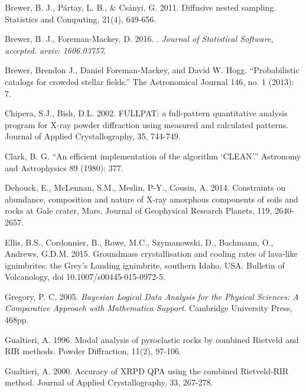 \documentclass[review]{elsarticle}
\newcommand{\changed}{\color{blue}}
\begin{document}
\begin{thebibliography}{99}
Brewer, B. J., Pártay, L. B., \& Csányi, G. 2011. Diffusive nested sampling. Statistics and Computing, 21(4), 649-656.

Brewer, B. J., Foreman-Mackey, D. 2016.
.
\newblock \emph{Journal of Statistical Software, accepted. arxiv: 1606.03757}.

{\changed 
{}
Brewer, Brendon J., Daniel Foreman-Mackey, and David W. Hogg. ``Probabilistic catalogs for crowded stellar fields.'' The Astronomical Journal 146, no. 1 (2013): 7.
}

Chipera, S.J., Bish, D.L. 2002. FULLPAT: a full-pattern quantitative analysis program for X-ray powder diffraction using measured and calculated patterns. Journal of Applied Crystallography, 35, 744-749.

{\changed 
{} Clark, B. G.
``An efficient implementation of the algorithm `CLEAN'.''
Astronomy and Astrophysics 89 (1980): 377.
}

Dehouck, E., McLennan, S.M., Meslin, P-Y., Cousin, A. 2014. Constraints on abundance, composition and nature of X-ray amorphous components of soils and rocks at Gale crater, Mars. Journal of Geophysical Research Planets, 119, 2640-2657.

Ellis, B.S., Cordonnier, B., Rowe, M.C., Szymanowski, D., Bachmann, O., Andrews, G.D.M. 2015. Groundmass crystallisation and cooling rates of lava-like ignimbrites: the Grey’s Landing ignimbrite, southern Idaho, USA. Bulletin of Volcanology, doi 10.1007/s00445-015-0972-5.

Gregory, P. C. 2005.
\newblock \emph{Bayesian Logical Data Analysis for the Physical Sciences: A
  Comparative Approach with Mathematica{\textregistered} Support}.
\newblock Cambridge University Press, 468pp.

Gualtieri, A. 1996. Modal analysis of pyroclastic rocks by combined Rietveld and RIR methods. Powder Diffraction, 11(2), 97-106.

Gualtieri, A. 2000. Accuracy of XRPD QPA using the combined Rietveld-RIR method. Journal of Applied Crystallography, 33, 267-278.


\end{thebibliography}
\end{document}
